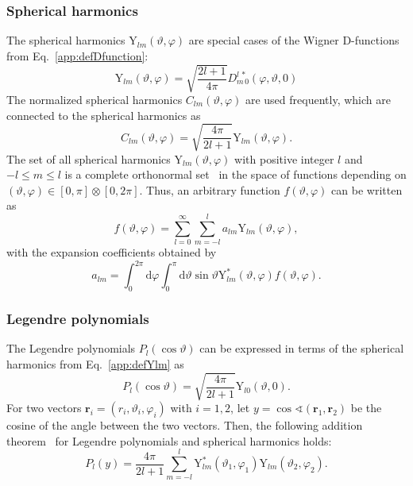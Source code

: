 \subsubsection*{Spherical harmonics}
The spherical harmonics $\text{Y}_{lm}(\vartheta,\varphi)$ are special cases of the Wigner D-functions~\cite{varshalovich1988} from Eq.~\eqref{app:defDfunction}:
\begin{equation}
\label{app:defYlm}
\text{Y}_{lm}(\vartheta,\varphi)=\sqrt{\frac{2l+1}{4\pi}}
D^{l\,*}_{m\,0}(\varphi,\vartheta,0)
\end{equation}
The normalized spherical harmonics $C_{lm}(\vartheta,\varphi)$ are used frequently, which are connected to the spherical harmonics as
\begin{equation}
C_{lm}(\vartheta,\varphi) = \sqrt{\frac{4\pi}{2l+1}}\text{Y}_{lm}(\vartheta,\varphi).
\end{equation}
The set of all spherical harmonics $\text{Y}_{lm}(\vartheta,\varphi)$ with positive integer $l$ and $-l\leq m \leq l$ is a complete orthonormal set~\cite{varshalovich1988} in the space of functions depending on $(\vartheta,\varphi)\in [0,\pi]\otimes [0,2\pi]$. Thus, an arbitrary function $f(\vartheta,\varphi)$ can be written as
\begin{equation}
f(\vartheta,\varphi)=\sum_{l=0}^\infty \sum_{m=-l}^l a_{lm}\text{Y}_{lm}(\vartheta,\varphi),
\end{equation}
with the expansion coefficients obtained by
\begin{equation}
a_{lm}=\int_0^{2\pi}\text{d}\varphi\int_0^\pi\text{d}\vartheta \sin\vartheta \text{Y}^{*}_{lm}(\vartheta,\varphi)f(\vartheta,\varphi).
\end{equation}

\subsubsection*{Legendre polynomials}
The Legendre polynomials $P_l(\cos\vartheta)$ can be expressed in terms of the spherical harmonics from Eq.~\eqref{app:defYlm} as
\begin{equation}
P_l(\cos\vartheta)=\sqrt{\frac{4\pi}{2l+1}}\text{Y}_{l0}(\vartheta,0).
\end{equation}
For two vectors $\mathbf{r}_i=(r_i,\vartheta_i,\varphi_i)$ with $i=1,2$, let $y=\cos\sphericalangle(\mathbf{r}_1,\mathbf{r}_2)$ be the cosine of the angle between the two vectors. Then, the following addition theorem~\cite{varshalovich1988} for Legendre polynomials and spherical harmonics holds:
\begin{equation}
\label{eq:legendreAddTheorem}
P_l(y) = \frac{4\pi}{2l+1}\sum_{m=-l}^l \text{Y}_{lm}^*(\vartheta_1,\varphi_1)\text{Y}_{lm}(\vartheta_2,\varphi_2).
\end{equation}
